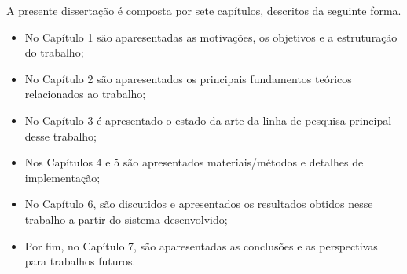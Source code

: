 A presente dissertação é composta por sete capítulos, descritos da seguinte forma.
\begin{itemize}
\item No Capítulo 1 são aparesentadas as motivações, os objetivos e a estruturação do trabalho;
\item No Capítulo 2 são aparesentados os principais fundamentos teóricos relacionados ao trabalho;
\item No Capítulo 3 é apresentado o estado da arte da linha de pesquisa principal desse trabalho;
\item Nos Capítulos 4 e 5 são apresentados materiais/métodos e detalhes de implementação;
\item No Capítulo 6, são discutidos e apresentados os resultados obtidos nesse trabalho a partir do sistema desenvolvido;
\item Por fim, no Capítulo 7, são aparesentadas as conclusões e as perspectivas para trabalhos futuros.
\end{itemize}
